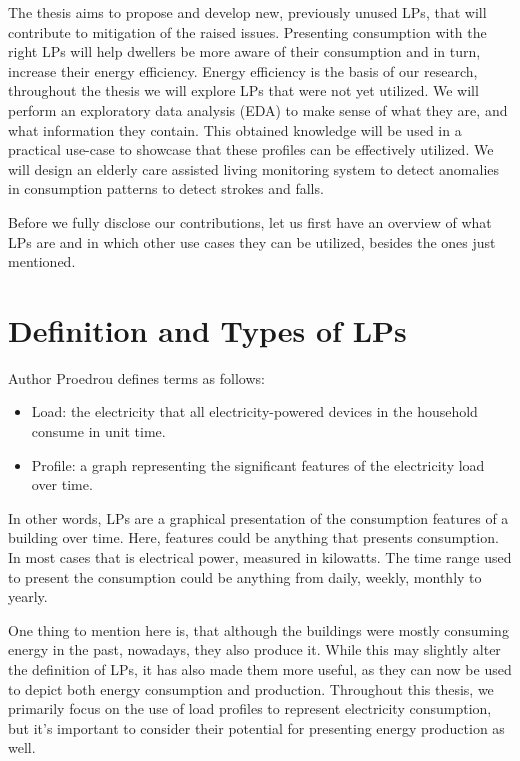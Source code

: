 The thesis aims to propose and develop new, previously unused LPs, that will contribute to mitigation of the raised issues.
Presenting consumption with the right LPs will help dwellers be more aware of their consumption and in turn, increase their energy efficiency.
Energy efficiency is the basis of our research, throughout the thesis we will explore LPs that were not yet utilized.
We will perform an exploratory data analysis (EDA) to make sense of what they are, and what information they contain.
This obtained knowledge will be used in a practical use-case to showcase that these profiles can be effectively utilized.
We will design an elderly care assisted living monitoring system to detect anomalies in consumption patterns to detect strokes and falls.

Before we fully disclose our contributions, let us first have an overview of what LPs are and in which other use cases they can be utilized, besides the ones just mentioned.


\section{Definition and Types of LPs}
\label{sec:LP_types}
Author Proedrou \cite{Review2021} defines terms as follows:


\begin{itemize}
	\item Load: the electricity that all electricity-powered devices in the household consume in unit time.
	\item Profile: a graph representing the significant features of the electricity load over time.
\end{itemize}

In other words, LPs are a graphical presentation of the consumption features of a building over time. 
Here, features could be anything that presents consumption. 
In most cases that is electrical power, measured in kilowatts.
The time range used to present the consumption could be anything from daily, weekly, monthly to yearly.

One thing to mention here is, that although the buildings were mostly consuming energy in the past, nowadays, they also produce it.
While this may slightly alter the definition of LPs, it has also made them more useful, as they can now be used to depict both energy consumption and production.
Throughout this thesis, we primarily focus on the use of load profiles to represent electricity consumption, but it's important to consider their potential for presenting energy production as well.

